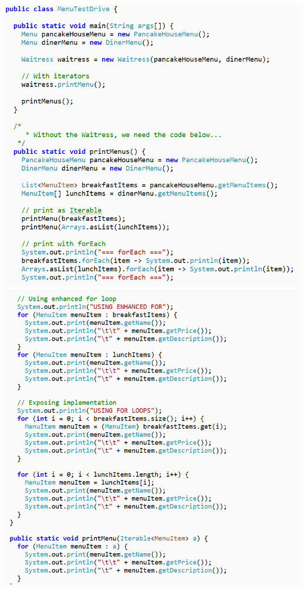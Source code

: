 \begin{center}
	\includegraphics[width=1\columnwidth,height=0.4\textheight]{GALLEYS/images/chapter3/images12}\\
	\includegraphics[width=1\columnwidth,height=0.5\textheight]{GALLEYS/images/chapter3/images13}\\
\end{center}
